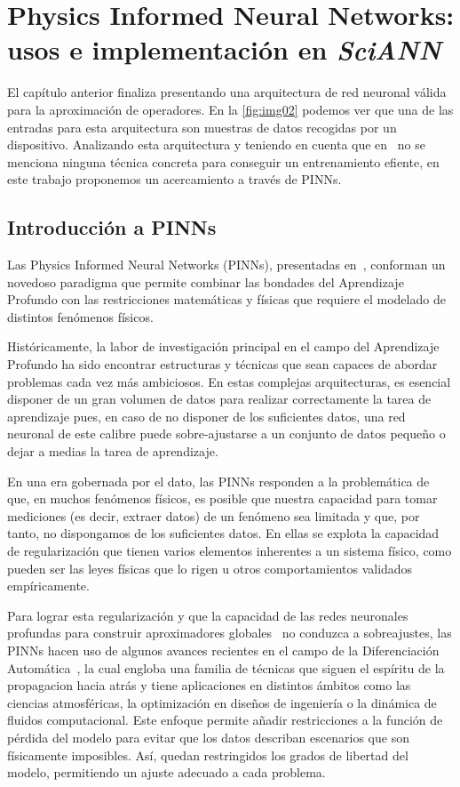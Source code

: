 \chapter{Physics Informed Neural Networks: usos e implementación en \textit{SciANN}}\label{ch:septimo-capitulo}

El capítulo anterior finaliza presentando una arquitectura de red neuronal válida para la aproximación de operadores. En la \autoref{fig:img02} podemos ver que una de las entradas para esta arquitectura son muestras de datos recogidas por un dispositivo. Analizando esta arquitectura y teniendo en cuenta que en~\cite{chen1995universal} no se menciona ninguna técnica concreta para conseguir un entrenamiento efiente, en este trabajo proponemos un acercamiento a través de PINNs. 

\section{Introducción a PINNs}
Las Physics Informed Neural Networks (PINNs), presentadas en~\cite{Raissi2019}, conforman un novedoso paradigma que permite combinar las bondades del Aprendizaje Profundo con las restricciones matemáticas y físicas que requiere el modelado de distintos fenómenos físicos. 

Históricamente, la labor de investigación principal en el campo del Aprendizaje Profundo ha sido encontrar estructuras y técnicas que sean capaces de abordar problemas cada vez más ambiciosos. En estas complejas arquitecturas, es esencial disponer de un gran volumen de datos para realizar correctamente la tarea de aprendizaje pues, en caso de no disponer de los suficientes datos, una red neuronal de este calibre puede sobre-ajustarse a un conjunto de datos pequeño o dejar a medias la tarea de aprendizaje. 


En una era gobernada por el dato, las PINNs responden a la problemática de que, en muchos fenómenos físicos, es posible que nuestra capacidad para tomar mediciones (es decir, extraer datos) de un fenómeno sea limitada y que, por tanto, no dispongamos de los suficientes datos. En ellas se explota la capacidad de regularización que tienen varios elementos inherentes a un sistema físico, como pueden ser las leyes físicas que lo rigen u otros comportamientos validados empíricamente. 

Para lograr esta regularización y que la capacidad de las redes neuronales profundas para construir aproximadores globales~\cite{Hornik1989} no conduzca a sobreajustes, las PINNs hacen uso de algunos avances recientes en el campo de la Diferenciación Automática~\cite{Baydin2015}, la cual engloba una familia de técnicas que siguen el espíritu de la propagacion hacia atrás y tiene aplicaciones en distintos ámbitos como las ciencias atmosféricas, la optimización en diseños de ingeniería o la dinámica de fluidos computacional. Este enfoque permite añadir restricciones a la función de pérdida del modelo para evitar que los datos describan escenarios que son físicamente imposibles. Así, quedan restringidos los grados de libertad del modelo, permitiendo un ajuste adecuado a cada problema. 

